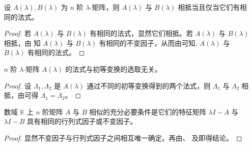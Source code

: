 \documentclass[../../main.tex]{subfiles}
\begin{document}
\begin{corollary}\label{corollary:相抵当且仅当它们有相同的法式}
设 $A(\lambda), B(\lambda)$ 为 $n$ 阶 $\lambda$-矩阵，则 $A(\lambda)$ 与 $B(\lambda)$ 相抵当且仅当它们有相同的法式。
\end{corollary}
\begin{proof}
若 $A(\lambda)$ 与 $B(\lambda)$ 有相同的法式，显然它们相抵。若 $A(\lambda)$ 与 $B(\lambda)$ 相抵，由 知 $A(\lambda)$ 与 $B(\lambda)$ 有相同的不变因子，从而由可知, $A(\lambda)$ 与 $B(\lambda)$ 有相同的法式。

\end{proof}

\begin{corollary}\label{corollary:矩阵法式与初等变换的选取无关}
$n$ 阶 $\lambda$-矩阵 $A(\lambda)$ 的法式与初等变换的选取无关。
\end{corollary}
\begin{proof}
设 $\varLambda_1, \varLambda_2$ 是 $A(\lambda)$ 通过不同的初等变换得到的两个法式，则 $\varLambda_1$ 与 $\varLambda_2$ 相抵，由可得 $\varLambda_1 = \varLambda_2$。

\end{proof}

\begin{theorem}\label{theorem:矩阵相似关于不变因子和行列式因子的充要条件}
数域 $\mathbb{K}$ 上 $n$ 阶矩阵 $A$ 与 $B$ 相似的充分必要条件是它们的特征矩阵 $\lambda I - A$ 与 $\lambda I - B$ 具有相同的行列式因子或不变因子。
\end{theorem}
\begin{proof}
显然不变因子与行列式因子之间相互唯一确定。再由、 及即得结论。

\end{proof}
\end{document}
